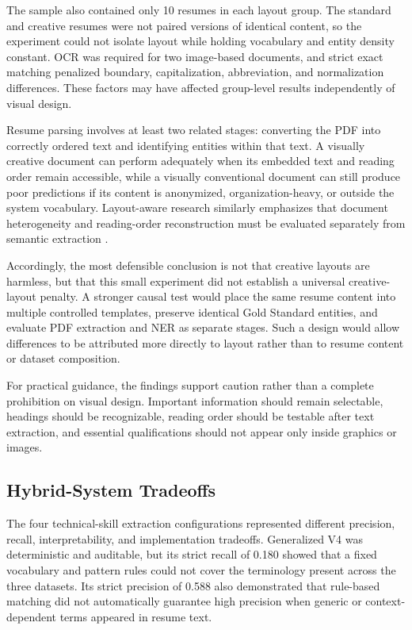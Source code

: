 \documentclass[conference]{IEEEtran}
\begin{document}
The sample also contained only 10 resumes in each layout group. The
standard and creative resumes were not paired versions of identical
content, so the experiment could not isolate layout while holding
vocabulary and entity density constant. OCR was required for two
image-based documents, and strict exact matching penalized boundary,
capitalization, abbreviation, and normalization differences. These
factors may have affected group-level results independently of visual
design.

Resume parsing involves at least two related stages: converting the PDF
into correctly ordered text and identifying entities within that text.
A visually creative document can perform adequately when its embedded
text and reading order remain accessible, while a visually conventional
document can still produce poor predictions if its content is
anonymized, organization-heavy, or outside the system vocabulary.
Layout-aware research similarly emphasizes that document heterogeneity
and reading-order reconstruction must be evaluated separately from
semantic extraction \cite{zhu2025layout}.

Accordingly, the most defensible conclusion is not that creative layouts
are harmless, but that this small experiment did not establish a
universal creative-layout penalty. A stronger causal test would place
the same resume content into multiple controlled templates, preserve
identical Gold Standard entities, and evaluate PDF extraction and NER as
separate stages. Such a design would allow differences to be attributed
more directly to layout rather than to resume content or dataset
composition.

For practical guidance, the findings support caution rather than a
complete prohibition on visual design. Important information should
remain selectable, headings should be recognizable, reading order should
be testable after text extraction, and essential qualifications should
not appear only inside graphics or images.

\subsection{Hybrid-System Tradeoffs}

The four technical-skill extraction configurations represented different
precision, recall, interpretability, and implementation tradeoffs.
Generalized V4 was deterministic and auditable, but its strict recall of
0.180 showed that a fixed vocabulary and pattern rules could not cover
the terminology present across the three datasets. Its strict precision
of 0.588 also demonstrated that rule-based matching did not automatically
guarantee high precision when generic or context-dependent terms appeared
in resume text.
\end{document}
